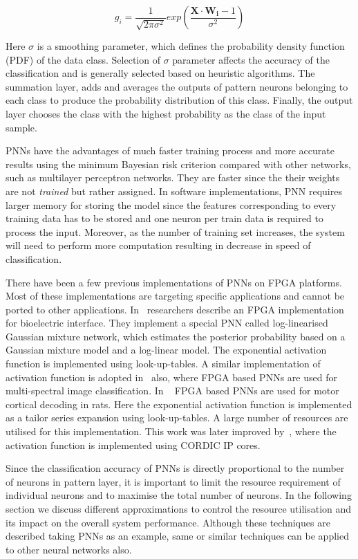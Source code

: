\begin{equation}
g_{i}=\frac{1}{\sqrt{2\pi\sigma^{2}}}exp\left(\frac{\boldsymbol{X\cdot W_{i}}-1}{\sigma^{2}}\right)
\end{equation}

Here $\sigma$ is a smoothing parameter, which defines the probability density function (PDF) of the data class. 
Selection of $\sigma$ parameter affects the accuracy of the classification and is generally selected based on heuristic algorithms.
The summation layer, adds and averages the outputs of pattern neurons belonging to each class to produce the probability distribution of this class. 
Finally, the output layer chooses the class with the highest probability as the class of the input sample.


PNNs have the advantages of much faster training process and more accurate results using the minimum Bayesian risk criterion compared with other networks, such as multilayer perceptron networks.
They are faster since the their weights are not \emph{trained} but rather assigned.
In software implementations, PNN requires larger memory for storing the model since the features corresponding to every training data has to be stored and one neuron per train data is required to process the input.
Moreover, as the number of training set increases, the system will need to perform more computation resulting in decrease in speed of classification. 

There have been a few previous implementations of PNNs on FPGA platforms.
Most of these implementations are targeting specific applications and cannot be ported to other applications.
In~\cite{Bu2004} researchers describe an FPGA implementation for bioelectric interface. 
They implement a special PNN called log-linearised Gaussian mixture network, which estimates the posterior probability based on a Gaussian mixture model and a log-linear model.
The exponential activation function is implemented using look-up-tables.
A similar implementation of activation function is adopted in~\cite{Figueiredo1998} also, where FPGA based PNNs are used for multi-spectral image classification.
In ~\cite{Zhou2010} FPGA based PNNs are used for motor cortical decoding in rats.
Here the exponential activation function is implemented as a tailor series expansion using look-up-tables.
A large number of resources are utilised for this implementation.
This work was later improved by~\cite{Zhu2010}, where the activation function is implemented using CORDIC IP cores.

Since the classification accuracy of PNNs is directly proportional to the number of neurons in pattern layer, it is important to limit the resource requirement of individual neurons and to maximise the total number of neurons.
In the following section we discuss different approximations to control the resource utilisation and its impact on the overall system performance.
Although these techniques are described taking PNNs as an example, same or similar techniques can be applied to other neural networks also.

